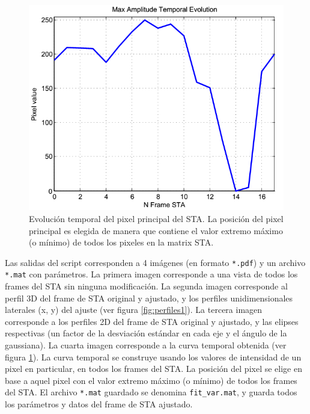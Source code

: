 \documentclass[10pt]{article}
\begin{document}
\begin{center}
\begin{figure}[h!]
\centering
\includegraphics[scale=0.5, natwidth=640, natheight=480]{temporalcurve_2.png} 	%
\caption{ Evolución temporal del pixel principal del STA. La posición del pixel principal es elegida de manera que contiene el valor extremo máximo (o mínimo) de todos los pixeles en la matrix STA. }
\label{fig:curvatemporal}
\end{figure}
\end{center}

Las salidas del script corresponden a 4 imágenes (en formato \verb+*.pdf+) y un archivo \verb+*.mat+ con parámetros. La primera imagen corresponde a una vista de todos los frames del STA sin ninguna modificación. La segunda imagen corresponde al perfil 3D del frame de STA original y ajustado, y los perfiles unidimensionales laterales (x, y) del ajuste (ver figura \ref{fig:perfiles1}). La tercera imagen corresponde a los perfiles 2D del frame de STA original y ajustado, y las elipses respectivas (un factor de la desviación estándar en cada eje y el ángulo de la gaussiana). La cuarta imagen corresponde a la curva temporal obtenida (ver figura \ref{fig:curvatemporal}). La curva temporal se construye usando los valores de intensidad de un pixel en particular, en todos los frames del STA. La posición del pixel se elige en base a aquel pixel con el valor extremo máximo (o mínimo) de todos los frames del STA. El archivo \verb+*.mat+ guardado se denomina \verb+fit_var.mat+, y guarda todos los parámetros y datos del frame de STA ajustado.
\end{document}
